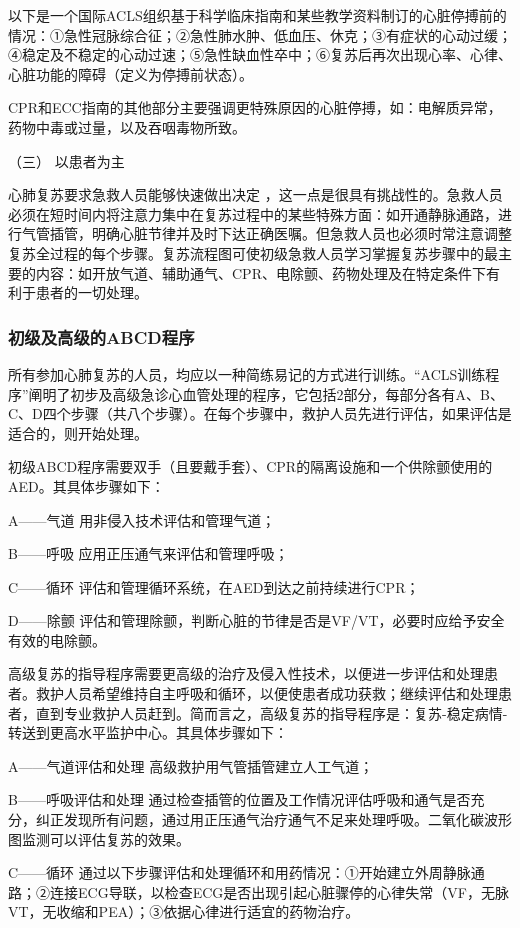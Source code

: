 以下是一个国际ACLS组织基于科学临床指南和某些教学资料制订的心脏停搏前的情况：①急性冠脉综合征；②急性肺水肿、低血压、休克；③有症状的心动过缓；④稳定及不稳定的心动过速；⑤急性缺血性卒中；⑥复苏后再次出现心率、心律、心脏功能的障碍（定义为停搏前状态）。

CPR和ECC指南的其他部分主要强调更特殊原因的心脏停搏，如：电解质异常，药物中毒或过量，以及吞咽毒物所致。

\hypertarget{text00284.htmlux5cux23CHP10-1-5-1-3}{}
（三） 以患者为主

心肺复苏要求急救人员能够快速做出决定
，这一点是很具有挑战性的。急救人员必须在短时间内将注意力集中在复苏过程中的某些特殊方面：如开通静脉通路，进行气管插管，明确心脏节律并及时下达正确医嘱。但急救人员也必须时常注意调整复苏全过程的每个步骤。复苏流程图可使初级急救人员学习掌握复苏步骤中的最主要的内容：如开放气道、辅助通气、CPR、电除颤、药物处理及在特定条件下有利于患者的一切处理。

\subsubsection{初级及高级的ABCD程序}

所有参加心肺复苏的人员，均应以一种简练易记的方式进行训练。“ACLS训练程序”阐明了初步及高级急诊心血管处理的程序，它包括2部分，每部分各有A、B、C、D四个步骤（共八个步骤）。在每个步骤中，救护人员先进行评估，如果评估是适合的，则开始处理。

初级ABCD程序需要双手（且要戴手套）、CPR的隔离设施和一个供除颤使用的AED。其具体步骤如下：

A------气道 用非侵入技术评估和管理气道；

B------呼吸 应用正压通气来评估和管理呼吸；

C------循环 评估和管理循环系统，在AED到达之前持续进行CPR；

D------除颤
评估和管理除颤，判断心脏的节律是否是VF/VT，必要时应给予安全有效的电除颤。

高级复苏的指导程序需要更高级的治疗及侵入性技术，以便进一步评估和处理患者。救护人员希望维持自主呼吸和循环，以便使患者成功获救；继续评估和处理患者，直到专业救护人员赶到。简而言之，高级复苏的指导程序是：复苏-稳定病情-转送到更高水平监护中心。其具体步骤如下：

A------气道评估和处理 高级救护用气管插管建立人工气道；

B------呼吸评估和处理
通过检查插管的位置及工作情况评估呼吸和通气是否充分，纠正发现所有问题，通过用正压通气治疗通气不足来处理呼吸。二氧化碳波形图监测可以评估复苏的效果。

C------循环
通过以下步骤评估和处理循环和用药情况：①开始建立外周静脉通路；②连接ECG导联，以检查ECG是否出现引起心脏骤停的心律失常（VF，无脉VT，无收缩和PEA）；③依据心律进行适宜的药物治疗。

